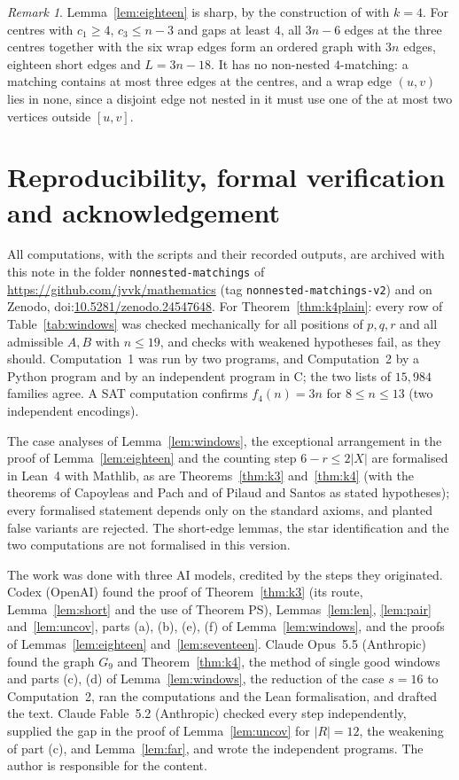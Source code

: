 \documentclass[11pt]{amsart}
\theoremstyle{definition}\newtheorem{problem}{Problem}
\theoremstyle{remark}\newtheorem*{remark}{Remark}
\begin{document}
\begin{remark}
Lemma~\ref{lem:eighteen} is sharp, by the construction of \cite[Section~2.2]{BFT} with $k=4$. For centres with $c_1\ge4$, $c_3\le n-3$ and gaps at least $4$, all $3n-6$ edges
at the three centres together with the six wrap edges form an ordered graph with $3n$ edges, eighteen short edges and
$L=3n-18$. It has no non-nested $4$-matching: a matching contains at most three edges at the centres, and a wrap edge
$(u,v)$ lies in none, since a disjoint edge not nested in it must use one of the at most two vertices outside $[u,v]$.
\end{remark}

\section*{Reproducibility, formal verification and acknowledgement}
All computations, with the scripts and their recorded outputs, are archived with this note in the folder
\texttt{nonnested-matchings} of \url{https://github.com/jvvk/mathematics} (tag \texttt{nonnested-matchings-v2}) and on
Zenodo, doi:\href{https://doi.org/10.5281/zenodo.24547648}{10.5281/zenodo.24547648}. For Theorem~\ref{thm:k4plain}: every row of Table~\ref{tab:windows} was checked mechanically
for all positions of $p,q,r$ and all admissible $A,B$ with $n\le 19$, and checks with weakened hypotheses fail, as they
should. Computation~1 was run by two programs, and Computation~2 by a Python program and by an independent program in
C; the two lists of $15{,}984$ families agree. A SAT computation confirms $f_4(n)=3n$ for $8\le n\le13$ (two independent
encodings).

The case analyses of Lemma~\ref{lem:windows}, the exceptional arrangement in the proof of Lemma~\ref{lem:eighteen} and
the counting step $6-r\le2|X|$ are formalised in Lean~4 with Mathlib, as are Theorems~\ref{thm:k3} and~\ref{thm:k4}
(with the theorems of Capoyleas and Pach and of Pilaud and Santos as stated hypotheses); every formalised statement
depends only on the standard axioms, and planted false variants are rejected. The short-edge lemmas, the star
identification and the two computations are not formalised in this version.

The work was done with three AI models, credited by the steps they originated. Codex (OpenAI) found the proof of
Theorem~\ref{thm:k3} (its route, Lemma~\ref{lem:short} and the use of Theorem PS), Lemmas~\ref{lem:len},
\ref{lem:pair} and~\ref{lem:uncov}, parts (a), (b), (e), (f) of Lemma~\ref{lem:windows}, and the proofs of
Lemmas~\ref{lem:eighteen} and~\ref{lem:seventeen}. Claude Opus~5.5 (Anthropic) found the graph $G_9$ and
Theorem~\ref{thm:k4}, the method of single good windows and parts (c), (d) of Lemma~\ref{lem:windows}, the reduction
of the case $s=16$ to Computation~2, ran the computations and the Lean formalisation, and drafted the text. Claude
Fable~5.2 (Anthropic) checked every step independently, supplied the gap in the proof of Lemma~\ref{lem:uncov} for
$|R|=12$, the weakening of part (c), and Lemma~\ref{lem:far}, and wrote the independent programs. The author is
responsible for the content.
\end{document}
